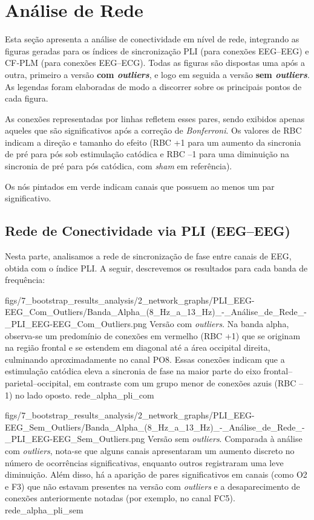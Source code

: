 \chapter{Análise de Rede}
\label{chap:analise_de_rede}
Esta seção apresenta a análise de conectividade em nível de rede, integrando as figuras geradas para os índices de sincronização PLI (para conexões EEG–EEG) e CF‐PLM (para conexões EEG–ECG). Todas as figuras são dispostas uma após a outra, primeiro a versão \textbf{com \textit{outliers}}, e logo em seguida a versão \textbf{sem \textit{outliers}}. As legendas foram elaboradas de modo a discorrer sobre os principais pontos de cada figura. 

As conexões representadas por linhas refletem esses pares, sendo exibidos apenas aqueles que são significativos após a correção de \textit{Bonferroni}. Os valores de RBC indicam a direção e tamanho do efeito (RBC +1 para um aumento da sincronia de pré para pós sob estimulação catódica e RBC –1 para uma diminuição na sincronia de pré para pós catódica, com \textit{sham} em referência).

Os nós pintados em verde indicam canais que possuem ao menos um par significativo.

\section{Rede de Conectividade via PLI (EEG–EEG)}
Nesta parte, analisamos a rede de sincronização de fase entre canais de EEG, obtida com o índice PLI.  A seguir, descrevemos os resultados para cada banda de frequência:

\smallfigure
{figs/7_bootstrap_results_analysis/2_network_graphs/PLI_EEG-EEG_Com_Outliers/Banda_Alpha_(8_Hz_a_13_Hz)_-_Análise_de_Rede_-_PLI_EEG-EEG_Com_Outliers.png}
{Versão com \textit{outliers}. Na banda alpha, observa-se um predomínio de conexões em vermelho (RBC +1) que se originam na região frontal e se estendem em diagonal até a área occipital direita, culminando aproximadamente no canal PO8. Essas conexões indicam que a estimulação catódica eleva a sincronia de fase na maior parte do eixo frontal–parietal–occipital, em contraste com um grupo menor de conexões azuis (RBC –1) no lado oposto.}
{rede_alpha_pli_com}

\smallfigure
{figs/7_bootstrap_results_analysis/2_network_graphs/PLI_EEG-EEG_Sem_Outliers/Banda_Alpha_(8_Hz_a_13_Hz)_-_Análise_de_Rede_-_PLI_EEG-EEG_Sem_Outliers.png}
{Versão sem \textit{outliers}. Comparada à análise com \textit{outliers}, nota-se que alguns canais apresentaram um aumento discreto no número de ocorrências significativas, enquanto outros registraram uma leve diminuição. Além disso, há a aparição de pares significativos em canais (como O2 e F3) que não estavam presentes na versão com \textit{outliers} e a desaparecimento de conexões anteriormente notadas (por exemplo, no canal FC5).}
{rede_alpha_pli_sem}

